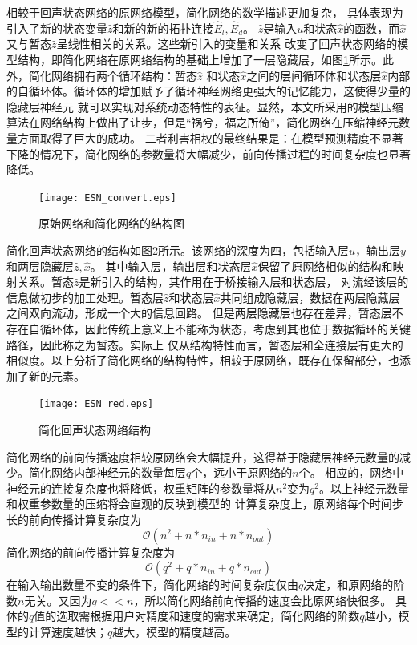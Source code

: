 相较于回声状态网络的原网络模型，简化网络的数学描述更加复杂， 具体表现为引入了新的状态变量\(\widehat{z}\)和新的新的拓扑连接\(\widehat{E}_l,\widehat{E}_d\)。
\(\widehat{z}\)是输入\(u\)和状态\(\widehat{x}\)的函数，而\(\widehat{x}\)又与暂态\(\widehat{z}\)呈线性相关的关系。这些新引入的变量和关系
改变了回声状态网络的模型结构，即简化网络在原网络结构的基础上增加了一层隐藏层，如图\ref{fig:esn_convert}所示。此外，简化网络拥有两个循环结构：暂态\(\widehat{z}\)
和状态\(\widehat{x}\)之间的层间循环体和状态层\(\widehat{x}\)内部的自循环体。循环体的增加赋予了循环神经网络更强大的记忆能力，这使得少量的隐藏层神经元
就可以实现对系统动态特性的表征。显然，本文所采用的模型压缩算法在网络结构上做出了让步，但是“祸兮，福之所倚”，简化网络在压缩神经元数量方面取得了巨大的成功。
二者利害相权的最终结果是：在模型预测精度不显著下降的情况下，简化网络的参数量将大幅减少，前向传播过程的时间复杂度也显著降低。
\begin{figure}
	\centering
	\texttt{[image: ESN\_convert.eps]}
	\caption{原始网络和简化网络的结构图}
	\label{fig:esn_convert}
\end{figure}

简化回声状态网络的结构如图\ref{fig:esn_red}所示。该网络的深度为四，包括输入层\(u\)，输出层\(y\)和两层隐藏层\(\widehat{z},\widehat{x}\)。
其中输入层，输出层和状态层\(\widehat{x}\)保留了原网络相似的结构和映射关系。暂态\(\widehat{z}\)是新引入的结构，其作用在于桥接输入层和状态层，
对流经该层的信息做初步的加工处理。暂态层\(\widehat{z}\)和状态层\(\widehat{x}\)共同组成隐藏层，数据在两层隐藏层之间双向流动，形成一个大的信息回路。
但是两层隐藏层也存在差异，暂态层不存在自循环体，因此传统上意义上不能称为状态，考虑到其也位于数据循环的关键路径，因此称之为暂态。实际上
仅从结构特性而言，暂态层和全连接层有更大的相似度。以上分析了简化网络的结构特性，相较于原网络，既存在保留部分，也添加了新的元素。 

\begin{figure}
	\centering
	\texttt{[image: ESN\_red.eps]}
	\caption{简化回声状态网络结构}
	\label{fig:esn_red}
\end{figure}

简化网络的前向传播速度相较原网络会大幅提升，这得益于隐藏层神经元数量的减少。简化网络内部神经元的数量每层\(q\)个，远小于原网络的\(n\)个。
相应的，网络中神经元的连接复杂度也将降低，权重矩阵的参数量将从\(n^2\)变为\(q^2\)。以上神经元数量和权重参数量的压缩将会直观的反映到模型的
计算复杂度上，原网络每个时间步长的前向传播计算复杂度为
\begin{equation}
	\mathcal{O}(n^2 + n*n_{in} + n*n_{out})
\end{equation}
简化网络的前向传播计算复杂度为
\begin{equation}
	\mathcal{O}(q^2 + q*n_{in} + q*n_{out})
\end{equation}
在输入输出数量不变的条件下，简化网络的时间复杂度仅由\(q\)决定，和原网络的阶数\(n\)无关。又因为\(q<<n\)，所以简化网络前向传播的速度会比原网络快很多。
具体的\(q\)值的选取需根据用户对精度和速度的需求来确定，简化网络的阶数\(q\)越小，模型的计算速度越快；\(q\)越大，模型的精度越高。

